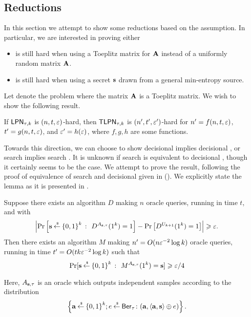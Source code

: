 \subsection{\LPN Reductions}
In this section we attempt to show some reductions based on the \LPN assumption.
In particular, we are interested in proving either
\begin{itemize}
	\item \LPN is still hard when using a Toeplitz matrix for ${\mathbf A}$ instead of a uniformly random matrix ${\mathbf A}$.
	\item \LPN is still hard when using a secret ${\mathbf s}$ drawn from a general min-entropy source.
\end{itemize}
Let \TLPN denote the \LPN problem where the matrix ${\mathbf A}$ is a Toeplitz matrix.
We wish to show the following result.
\begin{claim}
	If $\mathsf{LPN}_{\tau,k}$ is $(n,t,\varepsilon)$-hard, then $\mathsf{TLPN}_{\tau,k}$ is $(n',t',\varepsilon')$-hard for $n' = f(n,t,\varepsilon)$, $t' = g(n,t,\varepsilon)$, and $\varepsilon' = h(\varepsilon)$, where $f,g,h$ are some functions.
\end{claim}
Towards this direction, we can choose to show decisional \LPN implies decisional \TLPN, or search \LPN implies search \TLPN.
It is unknown if search \TLPN is equivalent to decisional \TLPN, though it certainly seems to be the case.
We attempt to prove the result, following the proof of equivalence of search and decisional \LPN given in  (\cite[Lemma 1]{JC:KatShiSmi10}).
We explicitly state the lemma as it is presented in \cite{JC:KatShiSmi10}.
\begin{importedlemma}
	Suppose there exists an algorithm $D$ making $n$ oracle queries, running in time $t$, and with
	\begin{align*}
		\abs{ \Pr\left[\bs \getsr \zo^k~\colon~ D^{A_{\bs,\tau}}(1^k) = 1\right] - \Pr\left[D^{U_{k+1}}(1^k)=1\right] } \geq \eps.
	\end{align*}
	Then there exists an algorithm $M$ making $n' = O(n\varepsilon^{-2}\log k)$ oracle queries, running in time $t' = O(tk\varepsilon^{-2}\log k)$ such that
	\begin{align*}
		\Pr[{\mathbf s} \mathbin{\stackrel{\mbox{\,\tiny \$}}{\gets}} {\{0,1\}}^k~\colon~ M^{A_{{\mathbf s},\tau}}(1^k)={\mathbf s}] \geqslant \varepsilon/4
	\end{align*}
\end{importedlemma}
\noindent Here, $A_{{\mathbf s},\tau}$ is an oracle which outputs independent samples according to the distribution
\begin{align*}
	\left\{ {\mathbf a}\mathbin{\stackrel{\mbox{\,\tiny \$}}{\gets}} {\{0,1\}}^k; e \mathbin{\stackrel{\mbox{\,\tiny \$}}{\gets}} \mathsf{Ber}_\tau\colon ({\mathbf a},\left\langle{\ensuremath{{\mathbf a}}},{{\mathbf s}}\right\rangle\oplus e) \right\}.
\end{align*}
